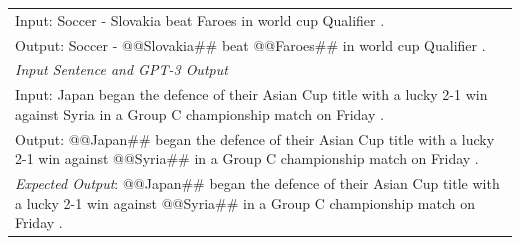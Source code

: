 \documentclass[11pt]{article}
\begin{document}
\begin{table}[th!]
{\begin{tabular}{l}
Input: Soccer - Slovakia beat Faroes in world cup Qualifier . \\
Output: Soccer - @@Slovakia\#\# beat @@Faroes\#\# in world cup Qualifier . \\\midrule
\textit{Input Sentence and GPT-3 Output} \\
Input: Japan began the defence of their Asian Cup title with a lucky 2-1 win against Syria in a Group C championship match on Friday . \\
Output: @@Japan\#\# began the defence of their Asian Cup title with a lucky 2-1 win against @@Syria\#\# in a Group C championship match on Friday .\\
{\color{blue}\it Expected Output}: @@Japan\#\# began the defence of their Asian Cup title with a lucky 2-1 win against @@Syria\#\# in a Group C championship match on Friday . \\\bottomrule


\end{tabular}}
\end{table}
\end{document}
